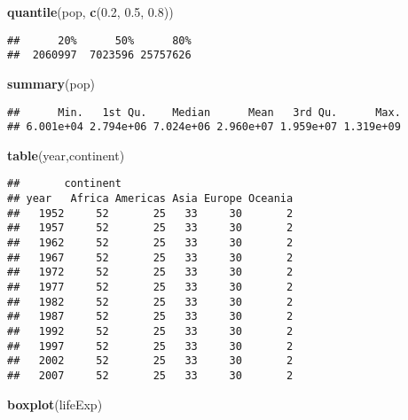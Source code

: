 \documentclass[]{article}
\newenvironment{Shaded}{\begin{snugshade}}{\end{snugshade}}
\newcommand{\FloatTok}[1]{\textcolor[rgb]{0.00,0.00,0.81}{#1}}
\newcommand{\KeywordTok}[1]{\textcolor[rgb]{0.13,0.29,0.53}{\textbf{#1}}}
\newcommand{\NormalTok}[1]{#1}
\begin{document}
\begin{Shaded}
\begin{Highlighting}[]
\KeywordTok{quantile}\NormalTok{(pop, }\KeywordTok{c}\NormalTok{(}\FloatTok{0.2}\NormalTok{, }\FloatTok{0.5}\NormalTok{, }\FloatTok{0.8}\NormalTok{))}
\end{Highlighting}
\end{Shaded}

\begin{verbatim}
##      20%      50%      80% 
##  2060997  7023596 25757626
\end{verbatim}

\begin{Shaded}
\begin{Highlighting}[]
\KeywordTok{summary}\NormalTok{(pop)}
\end{Highlighting}
\end{Shaded}

\begin{verbatim}
##      Min.   1st Qu.    Median      Mean   3rd Qu.      Max. 
## 6.001e+04 2.794e+06 7.024e+06 2.960e+07 1.959e+07 1.319e+09
\end{verbatim}

\begin{Shaded}
\begin{Highlighting}[]
\KeywordTok{table}\NormalTok{(year,continent)}
\end{Highlighting}
\end{Shaded}

\begin{verbatim}
##       continent
## year   Africa Americas Asia Europe Oceania
##   1952     52       25   33     30       2
##   1957     52       25   33     30       2
##   1962     52       25   33     30       2
##   1967     52       25   33     30       2
##   1972     52       25   33     30       2
##   1977     52       25   33     30       2
##   1982     52       25   33     30       2
##   1987     52       25   33     30       2
##   1992     52       25   33     30       2
##   1997     52       25   33     30       2
##   2002     52       25   33     30       2
##   2007     52       25   33     30       2
\end{verbatim}

\begin{Shaded}
\begin{Highlighting}[]
\KeywordTok{boxplot}\NormalTok{(lifeExp)}
\end{Highlighting}
\end{Shaded}
\end{document}
